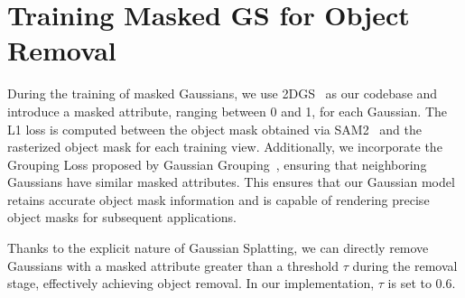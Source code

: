 


\section{Training Masked GS for Object Removal}
\label{sec:masked-gs}
During the training of masked Gaussians, we use 2DGS~\cite{huang20242d} as our codebase and introduce a masked attribute, ranging between 0 and 1, for each Gaussian. The L1 loss is computed between the object mask obtained via SAM2~\cite{ravi2024sam2} and the rasterized object mask for each training view. Additionally, we incorporate the Grouping Loss proposed by Gaussian Grouping~\cite{ye2023gaussian}, ensuring that neighboring Gaussians have similar masked attributes. This ensures that our Gaussian model retains accurate object mask information and is capable of rendering precise object masks for subsequent applications.

Thanks to the explicit nature of Gaussian Splatting, we can directly remove Gaussians with a masked attribute greater than a threshold $\tau$ during the removal stage, effectively achieving object removal. In our implementation, $\tau$ is set to 0.6.


